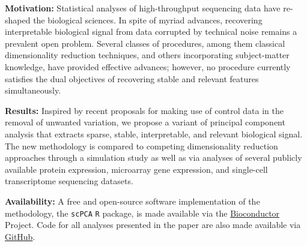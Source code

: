 \textbf{Motivation:} Statistical analyses of high-throughput sequencing data have re-shaped the biological sciences. In spite of myriad advances, recovering interpretable biological signal from data corrupted by technical noise remains a prevalent open problem. Several classes of procedures, among them classical dimensionality reduction techniques, and others incorporating subject-matter knowledge, have provided effective advances; however, no procedure currently satisfies the dual objectives of recovering stable and relevant features simultaneously. 

\textbf{Results:} Inspired by recent proposals for making use of control data in the removal of unwanted variation, we propose a variant of principal component analysis that extracts sparse, stable, interpretable, and relevant biological signal. The new methodology is compared to competing
dimensionality reduction approaches through a simulation study as well as via analyses of several publicly available protein expression, microarray gene expression, and single-cell transcriptome sequencing datasets.

\textbf{Availability:} A free and open-source software implementation of the methodology, the \texttt{scPCA} \texttt{R} package, is made available via the \href{https://bioconductor.org/packages/release/bioc/html/scPCA.html}{Bioconductor} Project. Code for all analyses presented in the paper are also made available via \href{https://github.com/PhilBoileau/EHDBDscPCA}{GitHub}.

